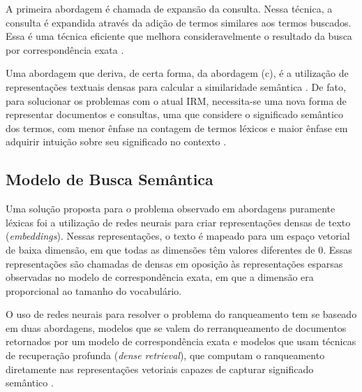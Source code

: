 \documentclass[
	12pt,				%
	openright,			%
	oneside,			%
	a4paper,			%
	english,			%
	french,				%
	spanish,			%
	brazil				%
	]{abntex2}
\begin{document}
A primeira abordagem é chamada de expansão da consulta.
Nessa técnica, a consulta é expandida através da adição de termos similares aos termos buscados.
Essa é uma técnica eficiente que melhora consideravelmente o resultado da busca por correspondência exata \cite{biblia}.

Uma abordagem que deriva, de certa forma, da abordagem (c), é a utilização de representações textuais densas para calcular a similaridade semântica \cite{biblia}.
De fato, para solucionar os problemas com o atual IRM, necessita-se uma nova forma de representar documentos e consultas, uma que considere o significado semântico dos termos, com menor ênfase na contagem de termos léxicos e maior ênfase em adquirir intuição sobre seu significado no contexto \cite{bhaskar-craswell-2018}.


\subsection{Modelo de Busca Semântica}\label{sec:modelo-de-busca-semantica}

Uma solução proposta para o problema observado em abordagens puramente léxicas foi a utilização de redes neurais para criar representações densas de texto (\textit{embeddings}).
Nessas representações, o texto é mapeado para um espaço vetorial de baixa dimensão, em que todas as dimensões têm valores diferentes de 0.
Essas representações são chamadas de densas em oposição às representações esparsas observadas no modelo de correspondência exata, em que a dimensão era proporcional ao tamanho do vocabulário.

O uso de redes neurais para resolver o problema do ranqueamento tem se baseado em duas abordagens, modelos que se valem do rerranqueamento de documentos retornados por um modelo de correspondência exata e modelos que usam técnicas de recuperação profunda (\textit{dense retrieval}), que computam o ranqueamento diretamente nas representações vetoriais capazes de capturar significado semântico \cite{biblia}.
\end{document}
